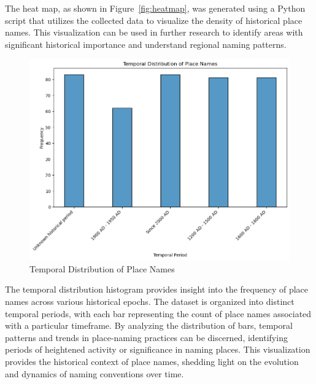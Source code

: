 The heat map, as shown in Figure~\ref{fig:heatmap}, was generated using a Python script that utilizes the collected data to visualize the density of historical place names. This visualization can be used in further research to identify areas with significant historical importance and understand regional naming patterns.

\begin{figure}[H]
    \centering
    \includegraphics[width=1\linewidth]{output2.png}
    \caption{Temporal Distribution of Place Names}
    \label{fig:histgram}
\end{figure}

The temporal distribution histogram provides insight into the frequency of place names across various historical epochs. The dataset is organized into distinct temporal periods, with each bar representing the count of place names associated with a particular timeframe. By analyzing the distribution of bars, temporal patterns and trends in place-naming practices can be discerned, identifying periods of heightened activity or significance in naming places. This visualization provides the historical context of place names, shedding light on the evolution and dynamics of naming conventions over time.


